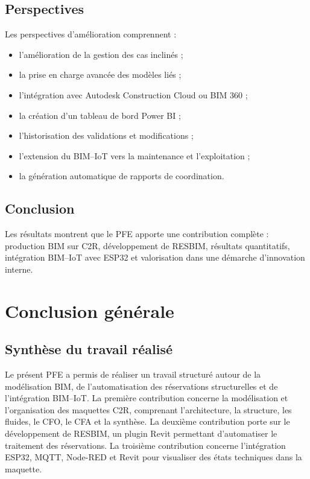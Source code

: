 \documentclass[12pt,a4paper]{report}
\begin{document}
\section{Perspectives}
Les perspectives d'amélioration comprennent :
\begin{itemize}[leftmargin=1.2cm]
    \item l'amélioration de la gestion des cas inclinés ;
    \item la prise en charge avancée des modèles liés ;
    \item l'intégration avec Autodesk Construction Cloud ou BIM 360 ;
    \item la création d'un tableau de bord Power BI ;
    \item l'historisation des validations et modifications ;
    \item l'extension du BIM--IoT vers la maintenance et l'exploitation ;
    \item la génération automatique de rapports de coordination.
\end{itemize}

\section{Conclusion}
Les résultats montrent que le PFE apporte une contribution complète : production BIM sur C2R, développement de RESBIM, résultats quantitatifs, intégration BIM--IoT avec ESP32 et valorisation dans une démarche d'innovation interne.

\chapter*{Conclusion générale}

\section*{Synthèse du travail réalisé}
Le présent PFE a permis de réaliser un travail structuré autour de la modélisation BIM, de l'automatisation des réservations structurelles et de l'intégration BIM--IoT. La première contribution concerne la modélisation et l'organisation des maquettes C2R, comprenant l'architecture, la structure, les fluides, le CFO, le CFA et la synthèse. La deuxième contribution porte sur le développement de RESBIM, un plugin Revit permettant d'automatiser le traitement des réservations. La troisième contribution concerne l'intégration ESP32, MQTT, Node-RED et Revit pour visualiser des états techniques dans la maquette.
\end{document}
